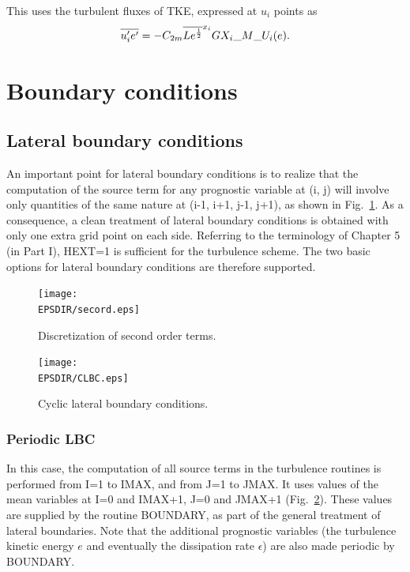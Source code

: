 This uses the turbulent fluxes of TKE, expressed at $u_i$ points as
\begin{equation}
\overline{u_i' e'}=- C_{2m} \overline{L e^{1 \over 2} }^{x_i} GX_i\_M\_U_i(e).
\end{equation}

\section{Boundary conditions}

\subsection{Lateral boundary conditions}

An important point for lateral boundary conditions is to realize that
the computation of the source term for any prognostic variable at (i, j)
will involve only quantities of the same nature at (i-1, i+1, j-1, j+1), as
shown in Fig.~\ref{secord}. As a consequence, a clean treatment of lateral
boundary conditions is obtained with only one extra grid point on each side.
Referring
to the terminology of Chapter 5 (in Part I), 
HEXT=1 is sufficient for the turbulence
scheme. The two basic options for lateral boundary conditions are therefore
supported.

\begin{figure}[!ht]
\centerline{\texttt{[image: \\EPSDIR/secord.eps]}}
\caption{Discretization of second order terms.}
\label{secord}
\end{figure}

\begin{figure}[!ht]
\centerline{\texttt{[image: \\EPSDIR/CLBC.eps]}}
\caption{Cyclic lateral boundary conditions.}
\label{clbc}
\end{figure}


\subsubsection{Periodic LBC}

In this case, the computation of all source terms in the turbulence routines
is performed from I=1 to IMAX, and from J=1 to JMAX. It uses values of the
mean variables at I=0 and IMAX+1, J=0 and JMAX+1 (Fig.~\ref{clbc}).
These values are supplied
by the routine BOUNDARY, as part of the general treatment of lateral
boundaries. Note that the additional prognostic variables (the turbulence
kinetic energy $e$ and eventually the dissipation rate $\epsilon$) are also
made periodic by BOUNDARY.

